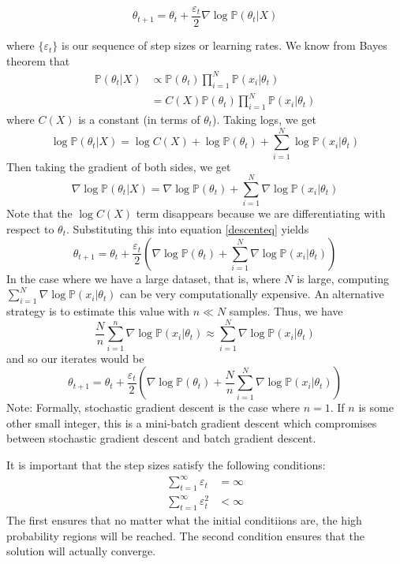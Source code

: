 \documentclass[letterpaper,12pt]{amsart}
\newcommand{\p}[1]{\mathbb{P}\!\left(#1\right)}
\begin{document}
\begin{equation}\label{descenteq}
\theta_{t+1} = \theta_t + \frac{\varepsilon_t}{2} \nabla \log \p{\theta_t | X}
\end{equation}


where $\{\varepsilon_t\}$ is our sequence of step sizes or learning rates. We know from Bayes theorem that
\begin{align*}
\p{\theta_t | X} &\propto \p{\theta_t} \prod_{i=1}^N \p{x_i | \theta_t} \\
&= C(X) \p{\theta_t} \prod_{i=1}^N \p{x_i | \theta_t} 
\end{align*}
where $C(X)$ is a constant (in terms of $\theta_t$). Taking logs, we get
\[\log \p{\theta_t | X} = \log C(X) + \log \p{\theta_t} + \sum_{i=1}^N \log \p{x_i | \theta_t}\]
Then taking the gradient of both sides, we get
\[\nabla \log \p{\theta_t | X} = \nabla \log \p{\theta_t} + \sum_{i=1}^N \nabla \log \p{x_i | \theta_t} \]
Note that the $\log C(X)$ term disappears because we are differentiating with respect to $\theta_t$. Substituting this into equation \eqref{descenteq} yields 
\[\theta_{t+1} = \theta_t + \frac{\varepsilon_t}{2} \left(\nabla \log \p{\theta_t} + \sum_{i=1}^N \nabla \log \p{x_i | \theta_t} \right)\]
In the case where we have a large dataset, that is, where $N$ is large, computing $\sum_{i=1}^N \nabla \log \p{x_i | \theta_t}$ can be very computationally expensive. An alternative strategy is to estimate this value with $n \ll N$ samples. Thus, we have
\[ \frac{N}{n}\sum_{i=1}^n \nabla \log \p{x_i | \theta_t} \approx  \sum_{i=1}^N \nabla \log \p{x_i | \theta_t}\]
and so our iterates would be
\[\theta_{t+1} = \theta_t + \frac{\varepsilon_t}{2}\left(\nabla \log \p{\theta_t} + \frac{N}{n}\sum_{i=1}^N \nabla \log \p{x_i | \theta_t} \right)\]
Note: Formally, stochastic gradient descent is the case where $n=1$. If $n$ is some other small integer, this is a mini-batch gradient descent which compromises between stochastic gradient descent and batch gradient descent.

It is important that the step sizes satisfy the following conditions:
\begin{align*}
\sum_{t=1}^\infty \varepsilon_t &= \infty\\
\sum_{t=1}^\infty \varepsilon_t^2 &< \infty
\end{align*}
The first ensures that no matter what the initial conditiions are, the high probability regions will be reached. The second condition ensures that the solution will actually converge.
\end{document}
